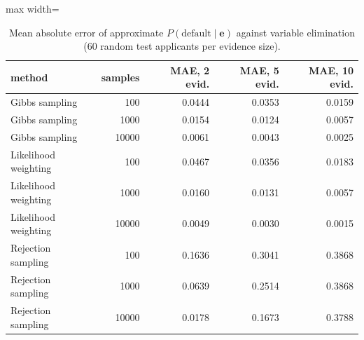\begin{table}[H]
\centering
\small
\begin{adjustbox}{max width=\linewidth}
\begin{tabular}{lrrrr}
\toprule
method & samples & MAE, 2 evid. & MAE, 5 evid. & MAE, 10 evid. \\
\midrule
Gibbs sampling & 100 & 0.0444 & 0.0353 & 0.0159 \\
Gibbs sampling & 1000 & 0.0154 & 0.0124 & 0.0057 \\
Gibbs sampling & 10000 & 0.0061 & 0.0043 & 0.0025 \\
Likelihood weighting & 100 & 0.0467 & 0.0356 & 0.0183 \\
Likelihood weighting & 1000 & 0.0160 & 0.0131 & 0.0057 \\
Likelihood weighting & 10000 & 0.0049 & 0.0030 & 0.0015 \\
Rejection sampling & 100 & 0.1636 & 0.3041 & 0.3868 \\
Rejection sampling & 1000 & 0.0639 & 0.2514 & 0.3868 \\
Rejection sampling & 10000 & 0.0178 & 0.1673 & 0.3788 \\
\bottomrule
\end{tabular}
\end{adjustbox}
\caption{Mean absolute error of approximate $P(\text{default} \mid \bm{e})$ against variable elimination (60 random test applicants per evidence size).}
\label{tab:bn_inference}
\end{table}
